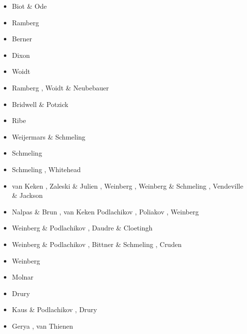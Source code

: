\begin{scriptsize}
\begin{itemize}
\item[\nineteensixtyfive] Biot \& Ode \cite{biod65}
\item[\nineteensixtyeight] Ramberg \cite{ramb68}
\item[\nineteenseventytwo] Berner \etal \cite{bers72}
\item[\nineteenseventyfive] Dixon \cite{dixo75}
\item[\nineteenseventyeight] Woidt \cite{woid78}
\item[\nineteeneighty] Ramberg \cite{ramb80}, Woidt \& Neubebauer \cite{wone80}
\item[\nineteeneightyone] Bridwell \& Potzick \cite{brpo81}
\item[\nineteeneightythree] Ribe \cite{ribe83}
\item[\nineteeneightysix] Weijermars \& Schmeling  \cite{wesc86}
\item[\nineteeneightyseven] Schmeling  \cite{schm87}
\item[\nineteeneightyeight] Schmeling \etal \cite{sccm88}, Whitehead \cite{whit88b}  
\item[\nineteenninetytwo] van Keken \etal \cite{vayv92}, Zaleski \& Julien \cite{zaju92}, 
                    Weinberg \cite{wein92}, Weinberg \& Schmeling \cite{wesc92},
                    Vendeville \& Jackson \cite{veja92}\cite{pepp92}
\item[\nineteenninetythree] Nalpas \& Brun \cite{nabr93}, van Keken \etal \cite{vayv93,vasv93}
                            Podlachikov \etal \cite{potp93}, Poliakov \etal \cite{povp93,pocp93},
                            Weinberg \cite{wein93}
\item[\nineteenninetyfour] Weinberg \& Podlachikov \cite{wepo94}, Daudre \& Cloetingh \cite{dacl94}
\item[\nineteenninetyfive] Weinberg \& Podlachikov \cite{wepo95}, Bittner \& Schmeling \cite{bisc95},
                           Cruden \etal \cite{crks95}
\item[\nineteenninetyseven] Weinberg \cite{wein97}
\item[\nineteenninetyeight] Molnar \etal \cite{mohc98}
\item[\nineteenninetynine] Drury \etal \cite{drdv99}
\item[\twothousandone] Kaus \& Podlachikov \cite{kapo01}, Drury \etal \cite{drvc01}
\item[\twothousandthree] Gerya \etal \cite{geur03}, van Thienen \etal \cite{vavd03}

\end{itemize}
\end{scriptsize}
